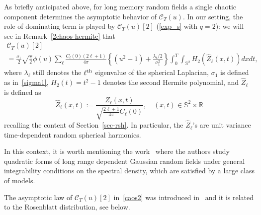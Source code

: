 \documentclass[10pt]{amsart}
\theoremstyle{definition}\newtheorem{defi}[theo]{Definition}\newtheorem{rema}[theo]{Remark}\newtheorem{exam}[theo]{Example}\newtheorem{exem}[theo]{Example}\newtheorem{nota}[theo]{Notation}
\newcommand{\clC}{\mathcal{C}}
\newcommand{\bbS}{\mathbb{S}}
\newcommand{\bbR}{\mathbb{R}}
\begin{document}
As briefly anticipated above, for long memory random fields a single chaotic component determines the asymptotic behavior of $\clC_T(u)$. In our setting, the role of dominating term is played by $\clC_T(u)[2]$ (\eqref{exp_s} with $q=2$): we will see in Remark~\ref{2chaos-hermite} that
\begin{multline}\label{caos2}
\clC_T(u)[2]\\
=\frac{\sigma _{1}}{2}\sqrt{\frac{\pi }{2}}\phi (u)\sum_{\ell } \frac{C_{\ell }(0)(2\ell +1)}{4\pi } \left\{ (u^{2}-1)+\frac{
\lambda _{\ell }/2}{\sigma _{1}^{2}}\right\} \int_0^T\int_{\bbS ^{2}}H_{2}\left(\widehat Z_{\ell }(x,t)\right)dxdt,
\end{multline}
where $\lambda_\ell$ still denotes the $\ell^{\rm th}$ eigenvalue of the spherical Laplacian, $\sigma_1$ is defined as in~\eqref{sigma1}, $ H_2(t)=t^2-1$ denotes the second Hermite polynomial, and $\widehat{Z}_\ell$ is defined as
\begin{equation}\label{zhat}
\widehat Z_\ell (x,t) := \frac{Z_\ell(x,t)}{\sqrt{\frac{2\ell+1}{4\pi} C_\ell(0)}}, \quad (x,t)\in \bbS^2\times \bbR
\end{equation}
recalling the content of Section~\ref{sec-rsh}. In particular, the $\widehat Z_\ell$'s are unit variance time-dependent random spherical harmonics.

In this context, it is worth mentioning the work~\cite{LP11} where the authors study quadratic forms of long range dependent Gaussian random fields under general integrability conditions on the spectral density, which are satisfied by a large class of models.

The asymptotic law of $\clC_T(u)[2]$ in~\eqref{caos2} was introduced in~\cite{MRV:20} and it is related to the Rosenblatt distribution, see below.
\end{document}
